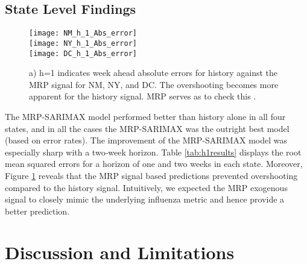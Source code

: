 \documentclass[fleqn,10pt]{wlscirep}
\begin{document}
\subsection*{State Level Findings}

\begin{figure}[h!]
 \centering
 \texttt{[image: NM\_h\_1\_Abs\_error]}\\
  \texttt{[image: NY\_h\_1\_Abs\_error]}\\
    \texttt{[image: DC\_h\_1\_Abs\_error]}
 \caption{a) h=1 indicates week ahead absolute errors for history against the MRP signal for NM,  NY, and DC. The overshooting becomes more apparent for the history signal. MRP serves as to check this .}
  \label{fig:State_Abs_Errs}
 \end{figure}

The MRP-SARIMAX model performed better than history alone in all four states, and in all the cases the MRP-SARIMAX was the outright best model (based on error rates). The improvement of the MRP-SARIMAX model was especially sharp with a two-week horizon. Table \ref{tab:h1results} displays the root mean squared errors for a horizon of one and two weeks in each state. Moreover, Figure \ref{fig:State_Abs_Errs} reveals that the MRP signal based predictions prevented overshooting compared to the history signal. Intuitively, we expected the MRP exogenous signal to closely mimic the underlying influenza metric and hence provide a better prediction.

\begin{table}[tbp]
\centering
\caption{(h = 1 week/h = 2 weeks) RMSE}
\label{tab:h1results}
\end{table}


\section*{Discussion and Limitations}
\end{document}

